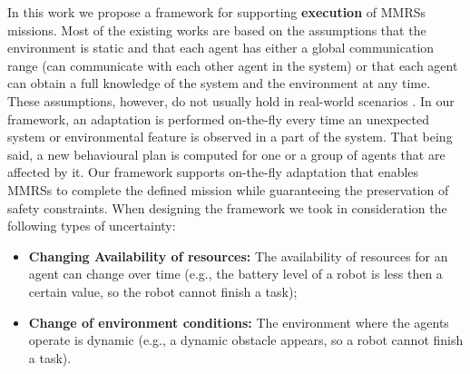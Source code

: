 \documentclass[journal]{IEEEtran}
\theoremstyle{definition}
\begin{document}
In this work we propose a framework for supporting \textbf{execution} of MMRSs missions. 
Most of the existing works are based on the assumptions that the environment is static and that each agent has either a global communication range (can communicate with each other agent in the system) or that each agent can obtain a full knowledge of the system and the environment at any time. These
assumptions, however, do not usually hold in real-world scenarios \cite{lahijanian2016iterative}.
In our framework, an adaptation is performed on-the-fly every time an unexpected system or environmental feature is observed in a part of the system. That being said, a new behavioural plan is computed for one or a group of agents that are affected by it. Our framework supports on-the-fly adaptation that enables MMRSs to complete the defined mission while guaranteeing the preservation of safety constraints.
When designing the framework we took in consideration the following types of uncertainty:
\begin{itemize}
\item \textbf{Changing Availability of resources:} The availability of resources for an agent can change over time (e.g., the battery level of a robot is less then a certain value, so the robot cannot finish a task);
\item \textbf{Change of environment conditions:} The environment where the agents operate is dynamic (e.g., a dynamic obstacle appears, so a robot cannot finish a task).
\end{itemize}
\end{document}
